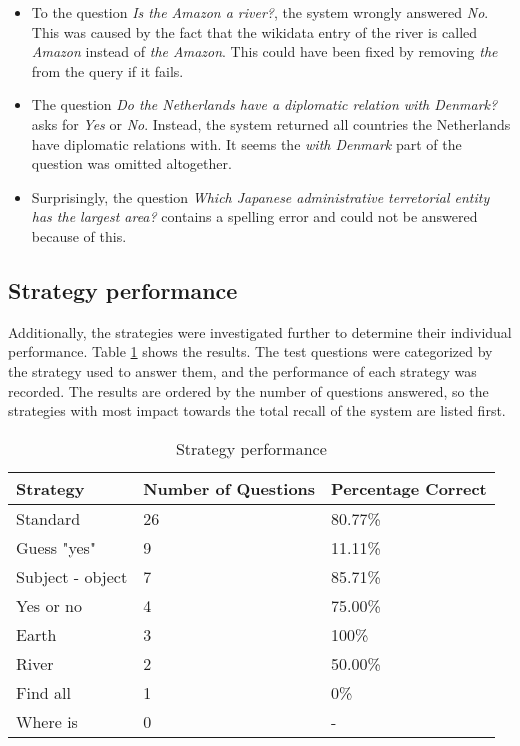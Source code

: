 \documentclass{article}
\begin{document}
\begin{itemize}
    \item To the question \emph{Is the Amazon a river?}, the system wrongly answered \emph{No}. This was caused by the fact that the wikidata entry of the river is called \emph{Amazon} instead of \emph{the Amazon}. This could have been fixed by removing \emph{the} from the query if it fails.
    \item The question \emph{Do the Netherlands have a diplomatic relation with Denmark?} asks for \emph{Yes} or \emph{No}. Instead, the system returned all countries the Netherlands have diplomatic relations with. It seems the \emph{with Denmark} part of the question was omitted altogether.
    \item Surprisingly, the question \emph{Which Japanese administrative terretorial entity has the largest area?} contains a spelling error and could not be answered because of this.
\end{itemize}

\subsection{Strategy performance}
Additionally, the strategies were investigated further to determine their individual performance. Table \ref{strategy-performance} shows the results. The test questions were categorized by the strategy used to answer them, and the performance of each strategy was recorded. The results are ordered by the number of questions answered, so the strategies with most impact towards the total recall of the system are listed first.

\begin{table}[h!]
\centering
\caption{Strategy performance}
\label{strategy-performance}
\begin{tabular}{l|l|l}
Strategy         & Number of Questions & Percentage Correct \\ \hline \hline
Standard         & 26                  & 80.77\%            \\\hline
Guess "yes"      & 9                   & 11.11\%            \\\hline
Subject - object & 7                   & 85.71\%            \\\hline
Yes or no        & 4                   & 75.00\%            \\\hline
Earth            & 3                   & 100\%              \\\hline
River            & 2                   & 50.00\%            \\\hline
Find all         & 1                   & 0\%                \\\hline
Where is         & 0                   & -                  
\end{tabular}
\end{table}
\end{document}
